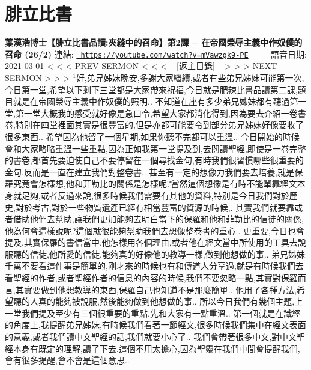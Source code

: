 \documentclass{book}
\begin{document}
\section{腓立比書}
\label{sec:mVawzgk9_PE}
\textbf{葉漢浩博士【腓立比書品讀:夾縫中的召命】第2課 ─ 在帝國榮辱主義中作奴僕的召命 (26/2)}
\newline
\newline
連結: \href{https://youtube.com/watch?v=mVawzgk9-PE}{\texttt{ https://youtube.com/watch?v=mVawzgk9-PE}} ~~~~ 語音日期: 2021-03-01 
\newline
\newline
\hyperref[sec:V3TY9OLIKOY]{\small{< < < PREV SERMON < < <}}
~
\hyperref[sec:index]{\small{[返主目錄]}}
~
\hyperref[sec:Y_0nqRPjKNA]{\small{> > > NEXT SERMON > > >}}
\newline
\newline
$^{1}$好,弟兄姊妹晚安,多謝大家繼續,或者有些弟兄姊妹可能第一次,今日第一堂,希望以下剩下三堂都是大家帶來祝福,今日就是肥辣比書品讀第二課,題目就是在帝國榮辱主義中作奴僕的照明..
不知道在座有多少弟兄姊妹都有聽過第一堂,第一堂大概我的感受就好像是急口令,希望大家都消化得到,因為要去介紹一卷書卷,特別在四堂裡面其實是很豐富的,但是亦都可能要令到部分弟兄姊妹好像要收了很多東西..
希望因為他留了一個星期,如果你聽不完都可以重溫..
今日開始的時候會和大家略略重溫一些重點,因為正如我第一堂提及到,去閱讀聖經,即使是一卷完整的書卷,都首先要迫使自己不要停留在一個尋找金句,有時我們很習慣哪些很重要的金句,反而是一直在建立我們對整卷書,.
甚至有一定的想像力我們要去培養,就是保羅究竟會怎樣想,他和菲勒比的關係是怎樣呢?當然這個想像是有時不能單靠經文本身就足夠,或者反過來說,很多時候我們需要有其他的資料,特別是今日我們對於歷史,對於考古,對於一些物質遺產已經有相當豐富的資源的時候,.
其實我們就要靠或者借助他們去幫助,讓我們更加能夠去明白當下的保羅和他和菲勒比的信徒的關係,他為何會這樣說呢?這個就很能夠幫助我們去想像整卷書的重心..
更重要,今日也會提及,其實保羅的書信當中,他怎樣用各個理由,或者他在經文當中所使用的工具去說服聽的信徒,他所愛的信徒,能夠真的好像他的教導一樣,做到他想做的事..
弟兄姊妹千萬不要看這件事是簡單的,剛才來的時候也有和傳道人分享過,就是有時候我們去看聖經的作者,或者聖經作者的信息的內容的時候,我們不要忽略一點,其實對保羅而言,其實要做到他想教導的東西,保羅自己也知道不是那麼簡單..
他用了各種方法,希望聽的人真的能夠被說服,然後能夠做到他想做的事..
所以今日我們有幾個主題,上一堂我們提及至少有三個很重要的重點,先和大家有一點重溫..
第一個就是在識經的角度上,我提醒弟兄姊妹,有時候我們看著一節經文,很多時候我們集中在經文表面的意義,或者我們讀中文聖經的話,我們就要小心了..
我們會帶著很多中文,對中文聖經本身有既定的理解,讀了下去.這個不用太擔心,因為聖靈在我們中間會提醒我們,會有很多提醒,會不會是這個意思..
\end{document}
